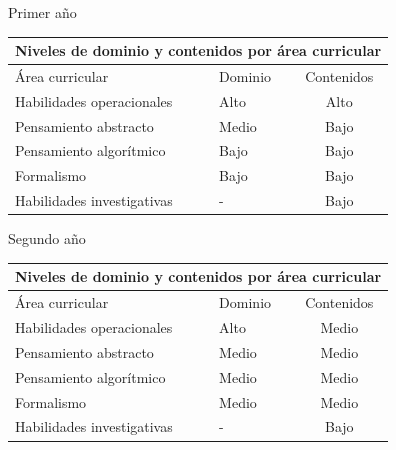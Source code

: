 %

\maketitle

\tableofcontents

\newpage
Primer año

\begin{table}[H]
\begin{center}
\begin{tabular}{|ccc|}
\hline
\multicolumn{3}{|c|}{\cellcolor[HTML]{00C0F3} \textbf{Niveles de dominio y contenidos por área curricular}} \\ \hline
\multicolumn{1}{|l|}{Área curricular} & \multicolumn{1}{l|}{Dominio} & Contenidos \\ \hline
\multicolumn{1}{|l|}{Habilidades operacionales} & \multicolumn{1}{l|}{Alto} & Alto \\ \hline
\multicolumn{1}{|l|}{Pensamiento abstracto} & \multicolumn{1}{l|}{Medio} & Bajo \\ \hline
\multicolumn{1}{|l|}{Pensamiento algorítmico} & \multicolumn{1}{l|}{Bajo} & Bajo \\ \hline
\multicolumn{1}{|l|}{Formalismo} & \multicolumn{1}{l|}{Bajo} & Bajo \\ \hline
\multicolumn{1}{|l|}{Habilidades investigativas} & \multicolumn{1}{l|}{-} & Bajo \\ \hline
\end{tabular}
\end{center}
\end{table}

Segundo año

\begin{table}[H]
\begin{center}
\begin{tabular}{|ccc|}
\hline
\multicolumn{3}{|c|}{\cellcolor[HTML]{00C0F3} \textbf{Niveles de dominio y contenidos por área curricular}} \\ \hline
\multicolumn{1}{|l|}{Área curricular} & \multicolumn{1}{l|}{Dominio} & Contenidos \\ \hline
\multicolumn{1}{|l|}{Habilidades operacionales} & \multicolumn{1}{l|}{Alto} & Medio \\ \hline
\multicolumn{1}{|l|}{Pensamiento abstracto} & \multicolumn{1}{l|}{Medio} & Medio \\ \hline
\multicolumn{1}{|l|}{Pensamiento algorítmico} & \multicolumn{1}{l|}{Medio} & Medio \\ \hline
\multicolumn{1}{|l|}{Formalismo} & \multicolumn{1}{l|}{Medio} & Medio \\ \hline
\multicolumn{1}{|l|}{Habilidades investigativas} & \multicolumn{1}{l|}{-} & Bajo \\ \hline
\end{tabular}
\end{center}
\end{table}

